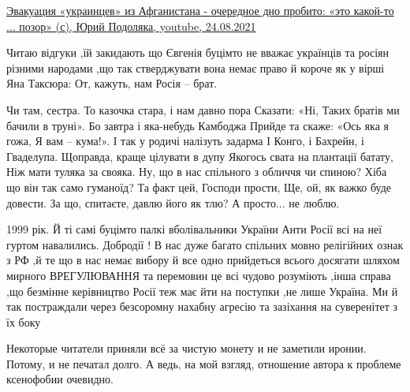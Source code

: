 \begin{itemize}
\href{https://youtu.be/XcXxLJcQfJc}{%
Эвакуация «украинцев» из Афганистана - очередное дно пробито: «это какой-то ... позор» (с), %
Юрий Подоляка, youtube, 24.08.2021%
}

 

Читаю відгуки ,їй закидають що Євгенія буцімто не вважає українців та росіян
різними народами ,що так стверджувати вона немає право й короче як у вірші Яна
Таксюра: От, кажуть, нам Росія – брат.

\obeycr
Чи там, сестра.
То казочка стара, і нам давно пора
Сказати: «Ні,
Таких братів ми бачили в труні».
\smallskip
Бо завтра і яка-небудь Камбоджа
Прийде та скаже: «Ось яка я гожа,
Я вам – кума!».
І так у родичі налізуть задарма
І Конго, і Бахрейн, і Гваделупа.
\smallskip
Щоправда, краще цілувати в дупу
Якогось свата на плантації батату,
Ніж мати туляка за свояка.
\smallskip
Ну, що в нас спільного з обличчя чи
спиною?
Хіба що він так само гуманоїд?
Та факт цей, Господи прости,
Ще, ой, як важко буде довести.
\smallskip
За що, спитаєте, давлю його як
тлю?
А просто... не люблю.
\restorecr

1999 рік. Й ті самі буцімто палкі вболівальники України Анти Росії всі на неї
гуртом навалились. Добродії ! В нас дуже багато спільних мовно релігійних ознак
з РФ ,й те що в нас немає вибору й все одно прийдеться всього досягати шляхом
мирного ВРЕГУЛЮВАННЯ та перемовин це всі чудово розуміють ,інша справа ,що
безмінне керівництво Росії теж має йти на поступки ,не лише Україна. Ми й так
постраждали через безсоромну нахабну агресію та зазіхання на суверенітет з їх
боку

 

Некоторые читатели приняли всё за чистую монету и не заметили иронии. Потому, и
не печатал долго. А ведь, на мой взгляд, отношение автора к проблеме ксенофобии
очевидно.


 


\end{itemize}
